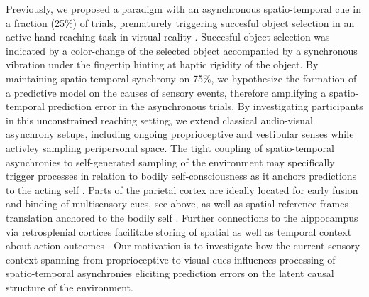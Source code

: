Previously, we proposed a paradigm with an asynchronous spatio-temporal cue in a fraction (25\%) of trials, prematurely triggering succesful object selection in an active hand reaching task in virtual reality \cite{Gehrke2019}. Succesful object selection was indicated by a color-change of the selected object accompanied by a synchronous vibration under the fingertip hinting at haptic rigidity of the object. By maintaining spatio-temporal synchrony on 75\%, we hypothesize the formation of a predictive model on the causes of sensory events, therefore amplifying a spatio-temporal prediction error in the asynchronous trials. By investigating participants in this unconstrained reaching setting, we extend classical audio-visual asynchrony setups, including ongoing proprioceptive and vestibular senses while activley sampling peripersonal space. The tight coupling of spatio-temporal asynchronies to self-generated sampling of the environment may specifically trigger processes in relation to bodily self-consciousness as it anchors predictions to the acting self \cite{Blanke2015, Guterstam2015a}. Parts of the parietal cortex are ideally located for early fusion and binding of multisensory cues, see above, as well as spatial reference frames translation anchored to the bodily self \cite{Clark2018, Gramann2009}. Further connections to the hippocampus via retrosplenial cortices facilitate storing of spatial as well as temporal context about action outcomes \cite{Pearson2011}. Our motivation is to investigate how the current sensory context spanning from proprioceptive to visual cues influences processing of spatio-temporal asynchronies eliciting prediction errors on the latent causal structure of the environment.





































